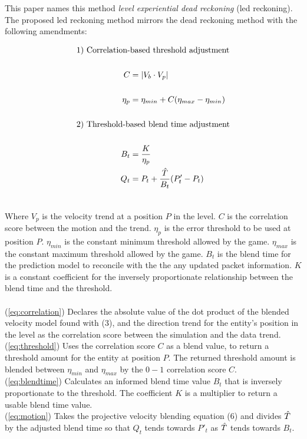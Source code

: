 \documentclass[journal]{IEEEtran}
\begin{document}
This paper names this method \textit{level experiential dead reckoning} (led reckoning). The proposed led reckoning method mirrors the dead reckoning method with the following amendments:

\begin{align}
        \text{1) Correlation-} & \text{based threshold adjustment} \nonumber \\
        \nonumber \\
        C & = |{V_b} \cdot {V_p}| \label{eq:correlation} \\
        \nonumber \\
        \eta_p & = {\eta_{min}} + C ({\eta_{max}} - {\eta_{min}}) \label{eq:threshold} \\
        \nonumber \\
        \text{2) Threshold-b} & \text{ased blend time adjustment} \nonumber \\
        \nonumber \\
        B_t & = \frac{K}{\eta_p} \label{eq:blendtime} \\
        Q_t & = P_t + \frac{\Hat{T}} {B_t} ({P'_t} - P_t ) \label{eq:motion}
        \\ \nonumber
\end{align}

Where $V_p$ is the velocity trend at a position $P$ in the level. $C$ is the correlation score between the motion and the trend. $\eta_p$ is the error threshold to be used at position $P$. $\eta_{min}$ is the constant minimum threshold allowed by the game. $\eta_{max}$ is the constant maximum threshold allowed by the game. $B_t$ is the blend time for the prediction model to reconcile with the the any updated packet information. $K$ is a constant coefficient for the inversely proportionate relationship between the blend time and the threshold.
\\ \\
(\ref{eq:correlation}) Declares the absolute value of the dot product of the blended velocity model found with (3), and the direction trend for the entity's position in the level as the correlation score between the simulation and the data trend. \\
(\ref{eq:threshold}) Uses the correlation score $C$ as a blend value, to return a threshold amount for the entity at position $P$. The returned threshold amount is blended between $\eta_{min}$ and $\eta_{max}$ by the $0 - 1$ correlation score $C$. \\
(\ref{eq:blendtime}) Calculates an informed blend time value $B_t$ that is inversely proportionate to the threshold. The coefficient $K$ is a multiplier to return a usable blend time value. \\
(\ref{eq:motion}) Takes the projective velocity blending equation (6) and divides $\Hat{T}$ by the adjusted blend time so that $Q_t$ tends towards $P'_t$ as $\Hat{T}$ tends towards $B_t$.
\end{document}
